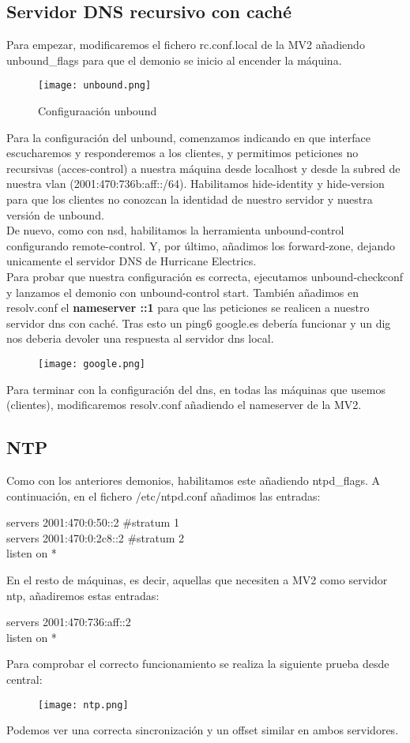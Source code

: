 \documentclass{article}
\begin{document}
\subsection{Servidor DNS recursivo con caché}
Para empezar, modificaremos el fichero rc.conf.local de la MV2 añadiendo unbound\_flags para que el demonio se inicio al encender la máquina.
\begin{figure}[!h]
	\centering
		\texttt{[image: unbound.png]}
			\caption{Configuraación unbound}
			\label{fig:nonflat}
\end{figure}
Para la configuración del unbound, comenzamos indicando en que interface escucharemos y responderemos a los clientes, y permitimos peticiones no recursivas (acces-control) a nuestra máquina desde localhost y desde la subred de nuestra vlan (2001:470:736b:aff::/64). Habilitamos hide-identity y hide-version para que los clientes no conozcan la identidad de nuestro servidor y nuestra versión de unbound.\\
De nuevo, como con nsd, habilitamos la herramienta unbound-control configurando remote-control.
Y, por último, añadimos los forward-zone, dejando unicamente el servidor DNS de Hurricane Electrics.\\
Para probar que nuestra configuración es correcta, ejecutamos unbound-checkconf y lanzamos el demonio con unbound-control start. También añadimos en resolv.conf el \textbf{nameserver ::1} para que las peticiones se realicen a nuestro servidor dns con caché. Tras esto un ping6 google.es debería funcionar y un dig nos deberia devoler una respuesta al servidor dns local.\\
\begin{figure}[!h]
	\centering
		\texttt{[image: google.png]}
			\label{fig:nonflat}
\end{figure}
Para terminar con la configuración del dns, en todas las máquinas que usemos (clientes), modificaremos resolv.conf añadiendo el nameserver de la MV2.
\subsection{NTP}
Como con los anteriores demonios, habilitamos este añadiendo ntpd\_flags. A continuación, en el fichero /etc/ntpd.conf añadimos las entradas: 
\begin{center}
servers 2001:470:0:50::2 \#stratum 1\\
servers 2001:470:0:2c8::2 \#stratum 2\\
listen on *\\
\end{center}
En el resto de máquinas, es decir, aquellas que necesiten a MV2 como servidor ntp, añadiremos estas entradas:
\begin{center}
servers 2001:470:736:aff::2\\
listen on *\\
\end{center}
Para comprobar el correcto funcionamiento se realiza la siguiente prueba desde central:
\begin{figure}[!h]
	\centering
		\texttt{[image: ntp.png]}
			\label{fig:nonflat}
\end{figure}
Podemos ver una correcta sincronización y un offset similar en ambos servidores.
\end{document}
